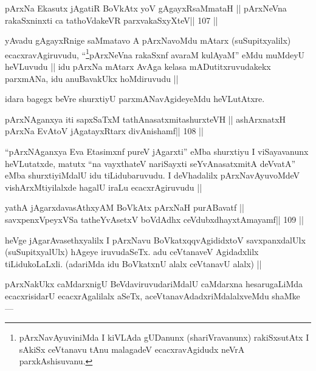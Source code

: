 \begin{shl}
pArxNa Ekasutx jAgatiR BoVkAtx yoV gAgayxRsaMmataH ||
pArxNeVna rakaSxninxti ca tathoVdakeVR parxvakaSxyXteV\hfill || 107 ||
\end{shl}

\begin{artha}
yAvadu gAgayxRnige saMmatavo A pArxNavoMdu mAtarx (suSupitxyalilx) 
ecacxravAgiruvudu, ``\footnote[12]{pArxNavAyuviniMda I kiVLAda gUDanunx 
(shariVravanunx) rakiSxsutAtx I sAkiSx ceVtanavu tAnu malagadeV ecacxravAgidudx neVrA parxkAshisuvanu.}pArxNeVna rakaSxnf avaraM kulAyaM'' eMdu muMdeyU heVLuvudu || idu pArxNa mAtarx AvAga kelasa mADutitxruvudakekx parxmANa, idu anuBavakUkx hoMdiruvudu ||
\end{artha}

\begin{artha}
idara bagegx beVre shurxtiyU parxmANavAgideyeMdu heVLutAtxre.
\end{artha} 

\begin{shl}
pArxNAganxya iti sapxSaTxM tathA\s nasatxmitashurxteVH ||
ashArxnatxH pArxNa EvAtoV jAgatayxRtarx divAnishamf\hfill || 108 ||
\end{shl}

\begin{artha}
``pArxNAganxya Eva Etasimxnf pureV jAgarxti'' eMba shurxtiyu I viSayavanunx heVLutatxde, matutx ``na vayxthateV nariSayxti seYvAnasatxmitA deVvatA'' eMba shurxtiyiMdalU idu tiLidubaruvudu. I deVhadalilx pArxNavAyuvoMdeV vishArxMtiyilalxde hagalU iraLu ecacxrAgiruvudu ||
\end{artha} 

\begin{shl}
yathA jAgarxdavasAthxyAM BoVkAtx pArxNaH purA\s Bavatf ||
savxpenxV\s peyxVSa tatheYvA\s\s setxV boVdAdhx ceVdubxdhayxtAmayamf\hfill || 109 ||
\end{shl}

\begin{artha}
heVge jAgarAvasethxyalilx I pArxNavu BoVkatxqqvAgididxtoV 
savxpanxdalUlx (suSupitxyalUlx) hAgeye iruvudaSeTx. adu ceVtanaveV 
Agidadxlilx tiLidukoLaLxli. (adariMda idu BoVkatxnU alalx ceVtanavU alalx) ||
\end{artha}

\begin{artha}
pArxNakUkx caMdarxnigU BeVdaviruvudariMdalU caMdarxna hesarugaLiMda ecacxrisidarU ecacxrAgalilalx aSeTx, aceVtanavAdadxriMdalalxveMdu shaMke --- 
\end{artha} 

